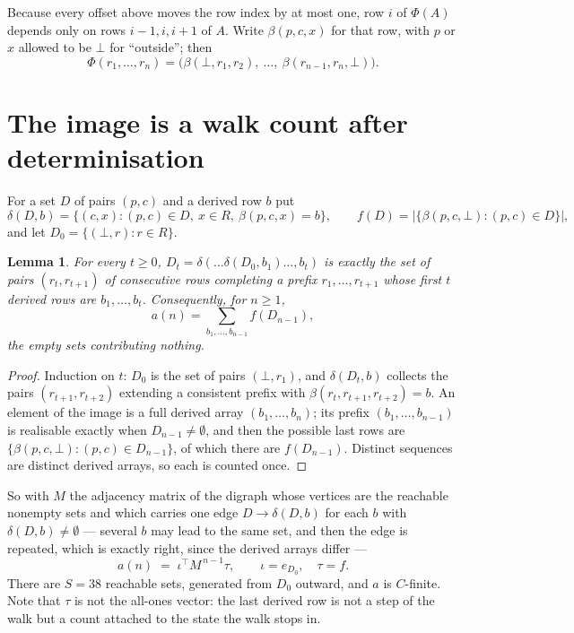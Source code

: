 \documentclass[11pt,a4paper]{article}
\theoremstyle{plain}
\newtheorem{lemma}[theorem]{Lemma}
\theoremstyle{definition}
\begin{document}
Because every offset above moves the row index by at most one, row $i$ of
$\Phi(A)$ depends only on rows $i-1,i,i+1$ of $A$. Write $\beta(p,c,x)$ for that row, with $p$
or $x$ allowed to be $\bot$ for ``outside''; then
\[
\Phi(r_1,\dots,r_n)=\bigl(\beta(\bot,r_1,r_2),\ \dots,\ \beta(r_{n-1},r_n,\bot)\bigr).
\]

\section{The image is a walk count after determinisation}

For a set $D$ of pairs $(p,c)$ and a derived row $b$ put
\[
\delta(D,b)=\{(c,x):(p,c)\in D,\ x\in R,\ \beta(p,c,x)=b\},\qquad
f(D)=\bigl|\{\beta(p,c,\bot):(p,c)\in D\}\bigr| ,
\]
and let $D_0=\{(\bot,r):r\in R\}$.

\begin{lemma}\label{lem:det}
For every $t\ge0$, $D_t=\delta(\dots\delta(D_0,b_1)\dots,b_t)$ is exactly the set of pairs
$(r_t,r_{t+1})$ of consecutive rows completing a prefix $r_1,\dots,r_{t+1}$ whose first $t$
derived rows are $b_1,\dots,b_t$. Consequently, for $n\ge1$,
\[
a(n)=\sum_{b_1,\dots,b_{n-1}}f(D_{n-1}),
\]
the empty sets contributing nothing.
\end{lemma}

\begin{proof}
Induction on $t$: $D_0$ is the set of pairs $(\bot,r_1)$, and $\delta(D_t,b)$ collects the
pairs $(r_{t+1},r_{t+2})$ extending a consistent prefix with
$\beta(r_t,r_{t+1},r_{t+2})=b$. An element of the image is a full derived array
$(b_1,\dots,b_n)$; its prefix $(b_1,\dots,b_{n-1})$ is realisable exactly when
$D_{n-1}\neq\emptyset$, and then the possible last rows are
$\{\beta(p,c,\bot):(p,c)\in D_{n-1}\}$, of which there are $f(D_{n-1})$. Distinct sequences
are distinct derived arrays, so each is counted once.
\end{proof}

So with $M$ the adjacency matrix of the digraph whose vertices are the reachable nonempty sets
and which carries one edge $D\to\delta(D,b)$ for each $b$ with $\delta(D,b)\neq\emptyset$ ---
several $b$ may lead to the same set, and then the edge is repeated, which is exactly right,
since the derived arrays differ ---
\[
a(n)\;=\;\iota^{\!\top}M^{\,n-1}\tau,\qquad \iota=e_{D_0},\quad \tau=f .
\]
There are $S=38$ reachable sets, generated from $D_0$ outward, and $a$ is $C$-finite.
Note that $\tau$ is not the all-ones vector: the last derived row is not a
step of the walk but a count attached to the state the walk stops in.
\end{document}
